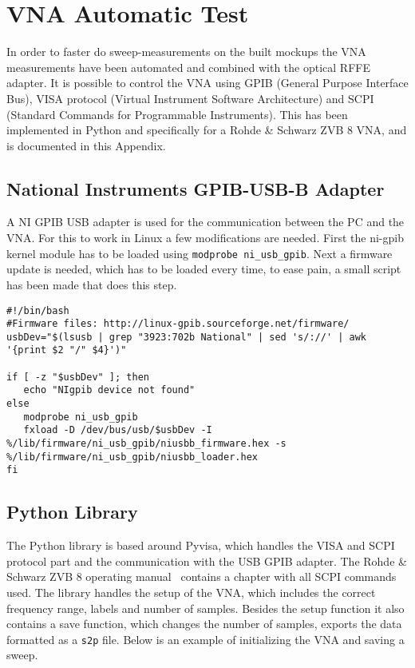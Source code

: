 \section{VNA Automatic Test}
\label{sec:vna_python}
In order to faster do sweep-measurements on the built mockups the VNA measurements have been automated and combined with the optical RFFE adapter. It is possible to control the VNA using GPIB (General Purpose Interface Bus), VISA protocol (Virtual Instrument Software Architecture) and SCPI (Standard Commands for Programmable Instruments). This has been implemented in Python and specifically for a Rohde \& Schwarz ZVB 8 VNA, and is documented in this Appendix. 

\subsection{National Instruments GPIB-USB-B Adapter}
A NI GPIB USB adapter is used for the communication between the PC and the VNA. For this to work in Linux a few modifications are needed. First the ni-gpib kernel module has to be loaded using \verb|modprobe ni_usb_gpib|. Next a firmware update is needed, which has to be loaded every time, to ease pain, a small script has been made that does this step. 

\begin{lstlisting}
#!/bin/bash
#Firmware files: http://linux-gpib.sourceforge.net/firmware/
usbDev="$(lsusb | grep "3923:702b National" | sed 's/://' | awk '{print $2 "/" $4}')"

if [ -z "$usbDev" ]; then
   echo "NIgpib device not found"
else
   modprobe ni_usb_gpib
   fxload -D /dev/bus/usb/$usbDev -I %/lib/firmware/ni_usb_gpib/niusbb_firmware.hex -s %/lib/firmware/ni_usb_gpib/niusbb_loader.hex    
fi
\end{lstlisting}

\subsection{Python Library}
The Python library is based around Pyvisa, which handles the VISA and SCPI protocol part and the communication with the USB GPIB adapter. The Rohde \& Schwarz ZVB 8 operating manual~\cite{} contains a chapter with all SCPI commands used. The library handles the setup of the VNA, which includes the correct frequency range, labels and number of samples. Besides the setup function it also contains a save function, which changes the number of samples, exports the data formatted as a \verb|s2p| file. Below is an example of initializing the VNA and saving a sweep. 


